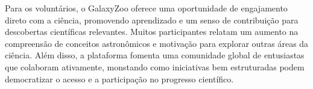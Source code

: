 Para os voluntários, o GalaxyZoo oferece uma oportunidade de engajamento direto com a ciência, promovendo aprendizado e um senso de contribuição para descobertas científicas relevantes. Muitos participantes relatam um aumento na compreensão de conceitos astronômicos e motivação para explorar outras áreas da ciência. Além disso, a plataforma fomenta uma comunidade global de entusiastas que colaboram ativamente, monstando como iniciativas bem estruturadas podem democratizar o acesso e a participação no progresso científico.








\chaptersep
